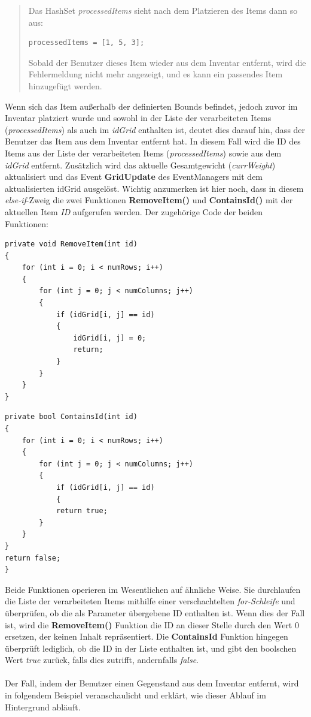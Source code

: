 \begin{quote}
Das HashSet \textit{processedItems} sieht nach dem Platzieren des Items dann so aus:
\begin{lstlisting}[style=csharp, label=code:controller_savedID]
processedItems = [1, 5, 3];
\end{lstlisting}

Sobald der Benutzer dieses Item wieder aus dem Inventar entfernt, wird die Fehlermeldung nicht mehr angezeigt, und es
kann ein passendes Item hinzugefügt werden.\\
\end{quote}

Wenn sich das Item außerhalb der definierten Bounds befindet, jedoch zuvor im Inventar platziert wurde und sowohl in der
Liste der verarbeiteten Items (\textit{processedItems}) als auch im \textit{idGrid} enthalten ist, deutet dies darauf hin,
dass der Benutzer das Item aus dem Inventar entfernt hat. In diesem Fall wird die ID des Items aus der Liste der verarbeiteten
Items (\textit{processedItems}) sowie aus dem \textit{idGrid} entfernt. Zusätzlich wird das aktuelle Gesamtgewicht
(\textit{currWeight}) aktualisiert und das Event \textbf{GridUpdate} des EventManagers mit dem aktualisierten idGrid
ausgelöst. Wichtig anzumerken ist hier noch, dass in diesem \textit{else-if}-Zweig die zwei Funktionen \textbf{RemoveItem()}
und \textbf{ContainsId()} mit der aktuellen Item \textit{ID} aufgerufen werden. Der zugehörige Code der beiden Funktionen:
\begin{lstlisting}[caption={Item aus Liste entfernen}, label=code:controller_removeItem, language={[Sharp]C}]
private void RemoveItem(int id)
{
    for (int i = 0; i < numRows; i++)
    {
        for (int j = 0; j < numColumns; j++)
        {
            if (idGrid[i, j] == id)
            {
                idGrid[i, j] = 0;
                return;
            }
        }
    }
}
\end{lstlisting}

\begin{lstlisting}[caption={Überprüfen ob ID in Liste enthalten ist}, label=code:controller_checkid, language={[Sharp]C}]
private bool ContainsId(int id)
{
    for (int i = 0; i < numRows; i++)
    {
        for (int j = 0; j < numColumns; j++)
        {
            if (idGrid[i, j] == id)
            {
            return true;
        }
    }
}
return false;
}
\end{lstlisting}

Beide Funktionen operieren im Wesentlichen auf ähnliche Weise. Sie durchlaufen die Liste der verarbeiteten Items mithilfe
einer verschachtelten \textit{for-Schleife} und überprüfen, ob die als Parameter übergebene ID enthalten ist. Wenn dies
der Fall ist, wird die \textbf{RemoveItem()} Funktion die ID an dieser Stelle durch den Wert 0 ersetzen, der keinen Inhalt
repräsentiert. Die \textbf{ContainsId} Funktion hingegen überprüft lediglich, ob die ID in der Liste enthalten ist, und
gibt den boolschen Wert \textit{true} zurück, falls dies zutrifft, andernfalls \textit{false}.\\
\\
Der Fall, indem der Benutzer einen Gegenstand aus dem Inventar entfernt, wird in folgendem Beispiel veranschaulicht und
erklärt, wie dieser Ablauf im Hintergrund abläuft.

